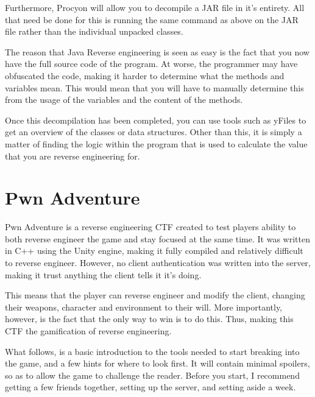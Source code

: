 		Furthermore, Procyon will allow you to decompile a JAR file in it's entirety. 
		All that need be done for this is running the same command as above on the JAR file rather than the individual unpacked classes. 

		The reason that Java Reverse engineering is seen as easy is the fact that you now have the full source code of the program. 
		At worse, the programmer may have obfuscated the code, making it harder to determine what the methods and variables mean. 
		This would mean that you will have to manually determine this from the usage of the variables and the content of the methods.

		Once this decompilation has been completed, you can use tools such as yFiles to get an overview of the classes or data structures. 
		Other than this, it is simply a matter of finding the logic within the program that is used to calculate the value that you are reverse engineering for. 
	
	\section{Pwn Adventure}
		Pwn Adventure is a reverse engineering CTF created to test players ability to both reverse engineer the game and stay focused at the same time.
		It was written in C++ using the Unity engine, making it fully compiled and relatively difficult to reverse engineer. 
		However, no client authentication was written into the server, making it trust anything the client tells it it's doing. 

		This means that the player can reverse engineer and modify the client, changing their weapons, character and environment to their will. 
		More importantly, however, is the fact that the only way to win is to do this.
		Thus, making this CTF the gamification of reverse engineering. 

		What follows, is a basic introduction to the tools needed to start breaking into the game, and a few hints for where to look first. 
		It will contain minimal spoilers, so as to allow the game to challenge the reader. 
		Before you start, I recommend getting a few friends together, setting up the server, and setting aside a week. 
